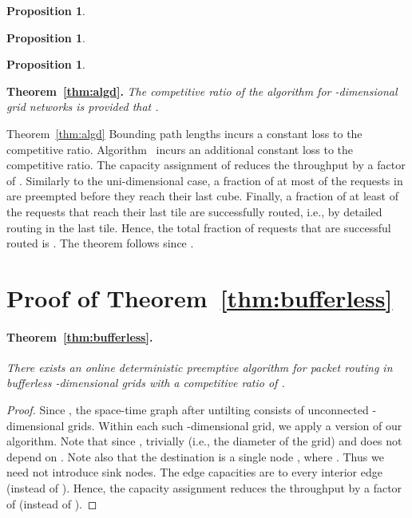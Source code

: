 \documentclass[11pt]{article}
\newtheorem{proposition}[theorem]{Proposition}
\newcommand{\route}{\text{\sc{ipp}}}
\newcommand{\IPP}{\route}
\newenvironment{proof sketch}[1]{\noindent {\emph{Proof sketch of #1:}}}{\hfill \qed}
\begin{document}
\begin{proposition}\label{prop:fippd}
    
\end{proposition}

\begin{proposition}\label{prop:preemptionsd}
    
\end{proposition}

\begin{proposition}\label{prop:lastd}\label{prop:Rsd}
    
\end{proposition}

\noindent \textbf{Theorem~\ref{thm:algd}.} \emph{The competitive ratio of the
algorithm for -dimensional grid networks is  provided that
.}
\medskip

\begin{proof sketch}{Theorem~\ref{thm:algd}}
    Bounding path lengths incurs a constant loss to the competitive
    ratio. Algorithm \IPP\ incurs an additional constant loss to the
    competitive ratio. The capacity assignment of  reduces
    the throughput by a factor of .
    Similarly to the uni-dimensional case, a fraction of at most  of the requests in  are preempted before they reach their last cube.
    Finally, a fraction of at least  of the requests that reach their last tile are successfully routed, i.e.,  by detailed routing in the last tile.
    Hence, the total fraction of requests that are successful routed is .
    The theorem follows since .
\end{proof sketch}


\section{Proof of Theorem~\ref{thm:bufferless}}\label{sec:proofs}

\paragraph{Theorem~\ref{thm:bufferless}.}
  \emph{There exists an online deterministic preemptive algorithm for packet
  routing in bufferless -dimensional grids with a competitive ratio of .}
\medskip

\begin{proof}Since , the space-time graph  after untilting
    consists of unconnected -dimensional grids.
Within each such -dimensional grid, we apply a version of our algorithm.  Note that since , trivially  (i.e., the diameter of the grid) and does not depend
    on . Note also that the destination is a single node
    , where . Thus we need not
    introduce sink nodes. The edge capacities are  to every interior edge (instead of
    ). Hence, the capacity assignment reduces the throughput by
    a factor of  (instead of ).
  \end{proof}
\end{document}
